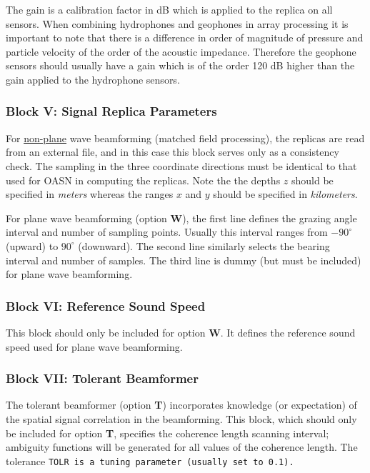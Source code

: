 The gain is a calibration factor in dB which is applied to
the replica on all sensors. When combining hydrophones and geophones
in array processing it is important to note that there is a  difference in
order of magnitude of pressure and particle velocity of the order of
the acoustic impedance. Therefore the geophone sensors should usually
have a gain which is of the order 120 dB higher than the gain applied to the
hydrophone sensors.

   
\subsubsection{Block V: Signal Replica Parameters}

For \underline{non-plane} wave beamforming (matched field processing),
the replicas are read from an external
file, and in this case this block serves only as a consistency check.
The sampling in the three coordinate directions must be identical to
that used for OASN in computing the replicas.
Note the the depths $z$
should be specified in {\em meters} whereas the ranges $x$ and $y$ should
be  specified  in {\em kilometers}.

For plane wave beamforming (option {\bf W}), the first line defines the
grazing angle interval and number of sampling points. Usually this
interval ranges from $-90^{\circ}$ (upward) to $90^{\circ}$ (downward).
The second line similarly selects the bearing interval and number of
samples. The third line is dummy (but must be included) for plane wave
beamforming. 

\subsubsection{Block VI: Reference Sound Speed}

This block should only be included for option {\bf W}. It defines the
reference sound speed used for plane wave beamforming.

\subsubsection{Block VII: Tolerant Beamformer}

The tolerant beamformer (option {\bf T}) incorporates knowledge (or
expectation) of the spatial signal correlation in the beamforming.
This block, which should only be included for option {\bf T},
specifies the coherence length  scanning interval; ambiguity functions 
will be generated for all values of the coherence length.
The tolerance \tt TOLR \rm is a tuning parameter (usually set to 0.1).

